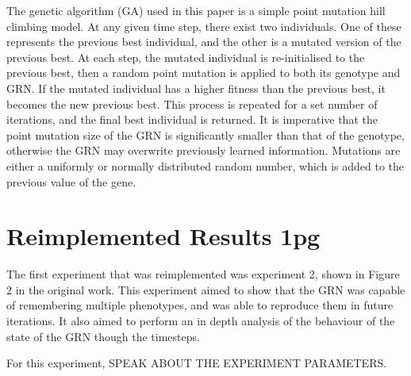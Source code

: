\documentclass[twocolumn,a4paper]{article}
\begin{document}
    The genetic algorithm (GA) used in this paper is a simple point mutation hill climbing model. At any given time step, there exist two individuals. One of these represents the previous best individual, and the other is a mutated version of the previous best. At each step, the mutated individual is re-initialised to the previous best, then a random point mutation is applied to both its genotype and GRN. If the mutated individual has a higher fitness than the previous best, it becomes the new previous best. This process is repeated for a set number of iterations, and the final best individual is returned. It is imperative that the point mutation size of the GRN is significantly smaller than that of the genotype, otherwise the GRN may overwrite previously learned information. Mutations are either a uniformly or normally distributed random number, which is added to the previous value of the gene.

    \section{Reimplemented Results 1pg}
    The first experiment that was reimplemented was experiment 2, shown in Figure 2 in the original work. This experiment aimed to show that the GRN was capable of remembering multiple phenotypes, and was able to reproduce them in future iterations. It also aimed to perform an in depth analysis of the behaviour of the state of the GRN though the timesteps.
    
    For this experiment, SPEAK ABOUT THE EXPERIMENT PARAMETERS.
\end{document}

